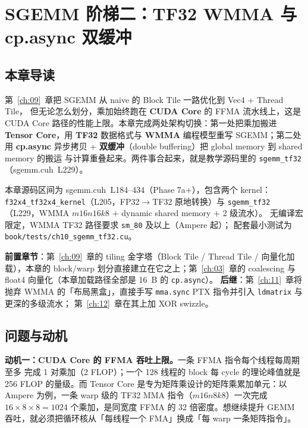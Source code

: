 \chapter{SGEMM 阶梯二：TF32 WMMA 与 cp.async 双缓冲}\label{ch:10}

\section{本章导读}

第~\ref{ch:09}~章把 SGEMM 从 naive 的 Block Tile 一路优化到 Vec4 + Thread Tile，
但无论怎么划分，乘加始终跑在 \textbf{CUDA Core} 的 FFMA 流水线上，这是
CUDA Core 路径的性能上限。本章完成两处架构切换：第一处把乘加搬进
\textbf{Tensor Core}，用 \textbf{TF32} 数据格式与 \textbf{WMMA} 编程模型重写
SGEMM；第二处用 \textbf{cp.async} 异步拷贝 +
\textbf{双缓冲}（double buffering）把 global memory 到 shared memory 的搬运
与计算重叠起来。两件事合起来，就是教学源码里的
\texttt{sgemm\_tf32}（sgemm.cuh~L229）。

本章源码区间为 sgemm.cuh~L184--434（Phase 7a+），包含两个 kernel：
\texttt{f32x4\_\allowbreak{}tf32x4\_\allowbreak{}kernel}（L205，FP32$\to$TF32 原地转换）与
\texttt{sgemm\_tf32}（L229，WMMA $m16n16k8$ + dynamic shared memory + 2 级流水）。
无编译宏限定，WMMA TF32 路径要求 \texttt{sm\_80} 及以上（Ampere 起）；
配套最小测试为 \texttt{book/\allowbreak{}tests/\allowbreak{}ch10\_\allowbreak{}sgemm\_\allowbreak{}tf32.cu}。

\textbf{前置章节}：第~\ref{ch:09}~章的 tiling 金字塔（Block Tile / Thread Tile /
向量化加载），本章的 block/warp 划分直接建立在它之上；第~\ref{ch:03}~章的
coalescing 与 float4 向量化（本章加载路径全部是 16~B 的 \texttt{cp.async}）。
\textbf{后继}：第~\ref{ch:11}~章将抛弃 WMMA 的「布局黑盒」，直接手写
\texttt{mma.sync} PTX 指令并引入 \texttt{ldmatrix} 与更深的多级流水；
第~\ref{ch:12}~章在其上加 XOR swizzle。

\section{问题与动机}

\textbf{动机一：CUDA Core 的 FFMA 吞吐上限。}一条 FFMA 指令每个线程每周期至多
完成 1 对乘加（2 FLOP）；一个 128 线程的 block 每 cycle 的理论峰值就是
256 FLOP 的量级。而 Tensor Core 是专为矩阵乘设计的矩阵乘累加单元：以
Ampere 为例，一条 warp 级的 TF32 MMA 指令（$m16n8k8$）一次完成
$16\times 8\times 8 = 1024$ 个乘加，是同宽度 FFMA 的 32 倍密度。想继续提升
GEMM 吞吐，就必须把循环核从「每线程一个 FMA」换成「每 warp 一条矩阵指令」。

